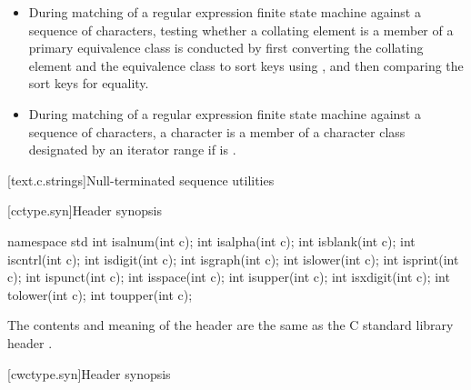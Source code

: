 \begin{itemize}
\item During matching of a regular expression finite state machine against a sequence of
characters, testing whether a collating element is a member of a primary equivalence
class is conducted by first converting the collating element and the equivalence
class to sort keys using , and then comparing the sort
keys for equality.
%
%

\item During matching of a regular expression finite state machine against a sequence
of characters, a character  is a member of a character class designated by an
iterator range  if
 is .
\end{itemize}

[text.c.strings]{Null-terminated sequence utilities}

[cctype.syn]{Header  synopsis}

%
%
%
%
%
%
%
%
%
%
%
%
%
%
\begin{codeblock}
namespace std {
  int isalnum(int c);
  int isalpha(int c);
  int isblank(int c);
  int iscntrl(int c);
  int isdigit(int c);
  int isgraph(int c);
  int islower(int c);
  int isprint(int c);
  int ispunct(int c);
  int isspace(int c);
  int isupper(int c);
  int isxdigit(int c);
  int tolower(int c);
  int toupper(int c);
}
\end{codeblock}

\pnum
The contents and meaning of the header 
are the same as the C standard library header .


[cwctype.syn]{Header  synopsis}

